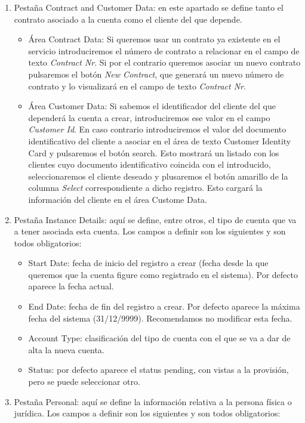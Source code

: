 \begin{enumerate}
\item Pestaña Contract and Customer Data: en este apartado se define tanto el contrato asociado a la cuenta como el cliente del que depende. 
	\begin{itemize}
		\item Área Contract Data: Si queremos usar un contrato ya existente en el servicio introduciremos el número de contrato a relacionar en el campo de texto \emph{Contract Nr}. Si por el contrario queremos asociar un nuevo contrato pulsaremos el botón \emph{New Contract}, que generará un nuevo número de contrato y lo visualizará en el campo de texto \emph{Contract Nr}.
		\item Área Customer Data: Si sabemos el identificador del cliente del que dependerá la cuenta a crear, introduciremos ese valor en el campo \emph{Customer Id}. En caso contrario introduciremos el valor del documento identificativo del cliente a asociar en el área de texto Customer Identity Card y pulsaremos el botón search. Esto mostrará un listado con los clientes cuyo documento identificativo coincida con el introducido, seleccionaremos el cliente deseado y plusaremos el botón amarillo de la columna \emph{Select} correspondiente a dicho registro. Esto cargará la información del cliente en el área Custome Data.		
	\end{itemize}		
\item Pestaña Instance Details: aquí se define, entre otros, el tipo de cuenta que va a tener asociada esta cuenta. Los campos a definir son los siguientes y son todos obligatorios:
	\begin{itemize}
	\item Start Date: fecha de inicio del registro a crear (fecha desde la que queremos que la cuenta figure como registrado en el sistema). Por defecto aparece la fecha actual.
	\item End Date: fecha de fin del registro a crear. Por defecto aparece la máxima fecha del sistema (31/12/9999). Recomendamos no modificar esta fecha.
	\item Account Type: clasificación del tipo de cuenta con el que se va a dar de alta la nueva cuenta.
	\item Status: por defecto aparece el status pending, con vistas a la provisión, pero se puede seleccionar otro.
	\end{itemize}
\item Pestaña Personal: aquí se define la información relativa a la persona física o jurídica. Los campos a definir son los siguientes y son todos obligatorios:

\end{enumerate}
